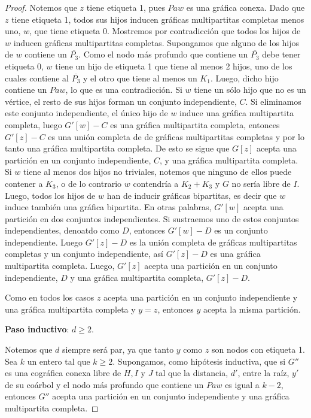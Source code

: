 \begin{proof}
    Notemos que $z$ tiene etiqueta 1, pues $Paw$ es una gráfica conexa. Dado que $z$ tiene etiqueta 1, todos sus hijos inducen gráficas multipartitas completas menos uno, $w$, que tiene etiqueta 0. Mostremos por contradicción que todos los hijos de $w$ inducen gráficas multipartitas completas. Supongamos que alguno de los hijos de $w$ contiene un $\overline{P_3}$. Como el nodo más profundo que contiene un $\overline{P_3}$ debe tener etiqueta 0, $w$ tiene un hijo de etiqueta 1 que tiene al menos 2 hijos, uno de los cuales contiene al $\overline{P_3}$ y el otro que tiene al menos un $K_1$. Luego, dicho hijo contiene un $Paw$, lo que es una contradicción. Si $w$ tiene un sólo hijo que no es un vértice, el resto de sus hijos forman un conjunto independiente, $C$. Si eliminamos este conjunto independiente, el único hijo de $w$ induce una gráfica multipartita completa, luego $G'[w] - C$ es una gráfica multipartita completa, entonces $G'[z] - C$ es una unión completa de de gráficas multipartitas completas y por lo tanto una gráfica multipartita completa. De esto se sigue que $G[z]$ acepta una partición en un conjunto independiente, $C$, y una gráfica multipartita completa. Si $w$ tiene al menos dos hijos no triviales, notemos que ninguno de ellos puede contener a $K_3$, o de lo contrario $w$ contendría a $K_2+K_3$ y $G$ no sería libre de $I$. Luego, todos los hijos de $w$ han de inducir gráficas bipartitas, es decir que $w$ induce también una gráfica bipartita. En otras palabras, $G'[w]$ acepta una partición en dos conjuntos independientes. Si sustraemos uno de estos conjuntos independientes, denoatdo como $D$, entonces $G'[w]-D$ es un conjunto independiente. Luego $G'[z]-D$ es la unión completa de gráficas multipartitas completas y un conjunto independiente, así $G'[z]-D$ es una gráfica multipartita completa. Luego, $G'[z]$ acepta una partición en un conjunto independiente, $D$ y una gráfica multipartita completa, $G'[z] - D$.

    Como en todos los casos $z$ acepta una partición en un conjunto independiente y una gráfica multipartita completa y $y = z$, entonces $y$ acepta la misma partición.

    \textbf{Paso inductivo}: $d \geq 2$.

    Notemos que $d$ siempre será par, ya que tanto $y$ como $z$ son nodos con etiqueta 1. Sea $k$ un entero tal que $k \geq 2$. Supongamos, como hipótesis inductiva, que si $G''$ es una cográfica conexa libre de $H, I$ y $J$ tal que la distancia, $d'$, entre la raíz, $y'$ de su coárbol y el nodo más profundo que contiene un $Paw$ es igual a $k-2$, entonces $G''$ acepta una partición en un conjunto independiente y una gráfica multipartita completa.


\end{proof}
